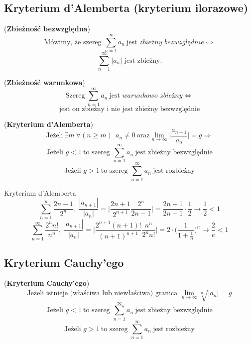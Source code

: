 \subsection{Kryterium d'Alemberta (kryterium ilorazowe)}

\begin{df}{(\textbf{Zbieżność bezwzględna})}
$$\text{Mówimy, że szereg } \sum_{n=1}^{\infty}a_{n}\ \text{jest } \textit{zbieżny bezwzględnie} \Leftrightarrow$$ $$\sum_{n=1}^{\infty}|a_{n}|\text{ jest zbieżny.}$$
\end{df}
\begin{df}{(\textbf{Zbieżność warunkowa})}
$$\text{Szereg}\ \sum_{n=1}^{\infty}a_{n}\ \text{jest } \textit{warunkowo zbieżny} \Leftrightarrow$$ $$\text{jest on zbieżny i nie jest zbieżny bezwzględnie}$$ 
\end{df}

\begin{df}{(\textbf{Kryterium d'Alemberta})}
$$\text{Jeżeli} \ \exists m\ \forall (n\geq m) \ \ a_n\neq 0 \ \text{oraz} \lim_{n \to \infty} \Big| \frac{a_{n+1}}{a_n} \Big| =g\Rightarrow $$ 
$$\text{Jeżeli } g<1 \ \text{to szereg } \sum_{n=1}^{\infty}a_n\ \text{jest zbieżny bezwzględnie}$$
$$\text{Jeżeli } g>1 \ \text{to szereg } \sum_{n=1}^{\infty}a_n\ \text{jest rozbieżny}$$
\end{df}

\begin{przyk}{Kryterium d'Alemberta}
$$\sum_{n=1}^{\infty}\frac{2n-1}{2^n},\ \frac{|a_{n+1}|}{|a_n|}=\bigg|\frac{2n+1}{2^{n+1}}\frac{2^n}{2n-1}\bigg|=\frac{2n+1}{2n-1}\cdot\frac{1}{2}\rightarrow\frac{1}{2}<1$$
$$\sum_{n=1}^{\infty}\frac{2^{n}n!}{n^n},\ \frac{|a_{n+1}|}{|a_n|}=\bigg|\frac{2^{n+1}(n+1)!}{(n+1)^{n+1}}\frac{n^n}{2^{n}n!}\bigg|=2\cdot\bigg(\frac{1}{1+\frac{1}{n}}\bigg)^n\rightarrow\frac{2}{e}<1$$
\end{przyk}

\subsection{Kryterium Cauchy'ego}

\begin{df}{(\textbf{Kryterium Cauchy'ego})}
$$\text{Jeżeli istnieje (właściwa lub niewłaściwa) granica } \lim_{n \to \infty}\sqrt[n]{|a_n|}=g $$ 
$$\text{Jeżeli } g<1 \ \text{to szereg } \sum_{n=1}^{\infty}a_n\ \text{jest zbieżny bezwzględnie}$$
$$\text{Jeżeli } g>1 \ \text{to szereg } \sum_{n=1}^{\infty}a_n\ \text{jest rozbieżny}$$
\end{df}

